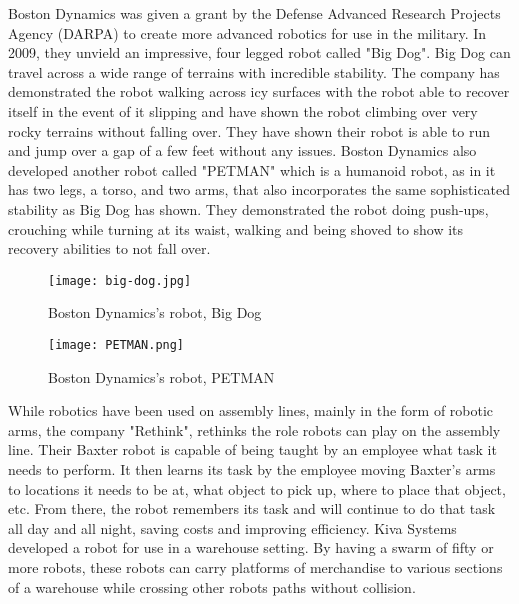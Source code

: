 \documentclass[12pt]{article}
\begin{document}
Boston Dynamics was given a grant by the Defense Advanced Research Projects Agency (DARPA) to create more advanced robotics for use in the military. In 2009, they unvield an impressive, four legged robot called "Big Dog". Big Dog can travel across a wide range of terrains with incredible stability. The company has demonstrated the robot walking across icy surfaces with the robot able to recover itself in the event of it slipping and have shown the robot climbing over very rocky terrains without falling over. They have shown their robot is able to run and jump over a gap of a few feet without any issues. Boston Dynamics also developed another robot called "PETMAN" which is a humanoid robot, as in it has two legs, a torso, and two arms, that also incorporates the same sophisticated stability as Big Dog has shown. They demonstrated the robot doing push-ups, crouching while turning at its waist, walking and being shoved to show its recovery abilities to not fall over. 


\begin{figure}[htp!]
	\begin{center}
		\texttt{[image: big-dog.jpg]}
		\caption{Boston Dynamics's robot, Big Dog } \label{fig.dog}
	\end{center}
\end{figure}

\begin{figure}[htp!]
	\begin{center}
		\texttt{[image: PETMAN.png]}
		\caption{Boston Dynamics's robot, PETMAN }  \label{fig.man}
	\end{center}
\end{figure}


While robotics have been used on assembly lines, mainly in the form of robotic arms, the company "Rethink", rethinks the role robots can play on the assembly line. Their Baxter robot is capable of being taught by an employee what task it needs to perform. It then learns its task by the employee moving Baxter's arms to locations it needs to be at, what object to pick up, where to place that object, etc. From there, the robot remembers its task and will continue to do that task all day and all night, saving costs and improving efficiency. Kiva Systems developed a robot for use in a warehouse setting. By having a swarm of fifty or more robots, these robots can carry platforms of merchandise to various sections of a warehouse while crossing other robots paths without collision.
\end{document}
